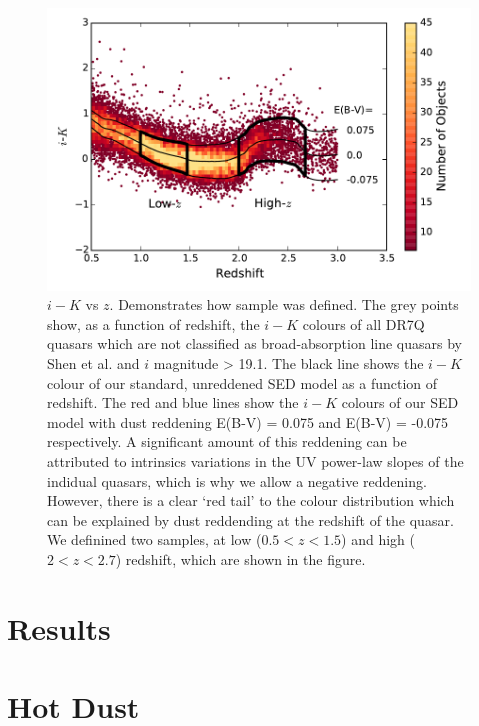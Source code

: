 \begin{figure}
  \centering
  \includegraphics[width=\columnwidth]{figures/chapter06/ikzplot}
  \caption{$i-K$ vs $z$. Demonstrates how sample was defined. The grey points show, as a function of redshift, the $i-K$ colours of all DR7Q quasars which are not classified as broad-absorption line quasars by Shen et al. and $i$ magnitude > 19.1. The black line shows the $i-K$ colour of our standard, unreddened SED model as a function of redshift. The red and blue lines show the $i-K$ colours of our SED model with dust reddening E(B-V) = 0.075 and E(B-V) = -0.075 respectively. A significant amount of this reddening can be attributed to intrinsics variations in the UV power-law slopes of the indidual quasars, which is why we allow a negative reddening. However, there is a clear `red tail' to the colour distribution which can be explained by dust reddending at the redshift of the quasar. We definined two samples, at low ($0.5 < z < 1.5$) and high ($2 < z < 2.7$) redshift, which are shown in the figure.}
  \label{fig:ikzplot}
\end{figure}

\section{Results}

\section{Hot Dust}

